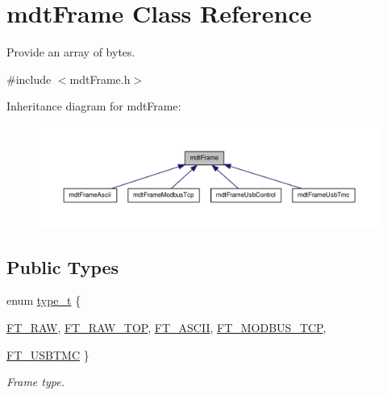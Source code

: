 \hypertarget{classmdt_frame}{
\section{mdtFrame Class Reference}
\label{classmdt_frame}
}


Provide an array of bytes.  




{\ttfamily \#include $<$mdtFrame.h$>$}



Inheritance diagram for mdtFrame:
\nopagebreak
\begin{figure}[H]
\begin{center}
\leavevmode
\includegraphics[width=400pt]{classmdt_frame__inherit__graph}
\end{center}
\end{figure}
\subsection*{Public Types}
\begin{DoxyCompactItemize}
\item 
enum \hyperlink{classmdt_frame_af936e37d5fe4c066c0fb0161fafd4a17}{type\_\-t} \{ \par
\hyperlink{classmdt_frame_af936e37d5fe4c066c0fb0161fafd4a17aeb10e33f775c33799273fcb130fee86f}{FT\_\-RAW}, 
\hyperlink{classmdt_frame_af936e37d5fe4c066c0fb0161fafd4a17ac91a1c1827fa634eadaddb861f805c96}{FT\_\-RAW\_\-TOP}, 
\hyperlink{classmdt_frame_af936e37d5fe4c066c0fb0161fafd4a17ac649559564652abbe656b97d4a84b722}{FT\_\-ASCII}, 
\hyperlink{classmdt_frame_af936e37d5fe4c066c0fb0161fafd4a17a72c8ddaf29839f4037b686bdc346828a}{FT\_\-MODBUS\_\-TCP}, 
\par
\hyperlink{classmdt_frame_af936e37d5fe4c066c0fb0161fafd4a17aca438ff6b553a819f22090facc562c86}{FT\_\-USBTMC}
 \}
\begin{DoxyCompactList}\small\item\em Frame type. \end{DoxyCompactList}\end{DoxyCompactItemize}
